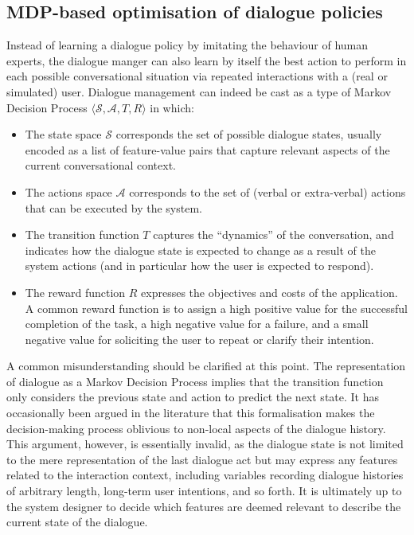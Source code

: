 
\subsection{MDP-based optimisation of dialogue policies}

Instead of learning a dialogue policy by imitating the behaviour of human experts, the dialogue manger can also learn by itself the best action to perform in each possible conversational situation via repeated interactions with a (real or simulated) user.  Dialogue management can indeed be cast as a type of Markov Decision Process $\langle \mathcal{S}, \mathcal{A}, T, R \rangle$ in which: 
\begin{itemize}
\item The state space $\mathcal{S}$ corresponds the set of possible dialogue states, usually encoded as a list of feature-value pairs that capture relevant aspects of the current conversational context.
\item The actions space $\mathcal{A}$ corresponds to the set of (verbal or extra-verbal) actions that can be executed by the system.
\item The transition function $T$ captures the ``dynamics'' of the conversation, and indicates how the dialogue state is expected to change as a result of the system actions (and in particular how the user is expected to respond). 
\item The reward function $R$ expresses the objectives and costs of the application. A common reward function is to assign a high positive value for the successful completion of the task, a high negative value for a failure, and a small negative value for soliciting the user to repeat or clarify their intention.  
\end{itemize}

A common misunderstanding should be clarified at this point. The representation of dialogue as a Markov Decision Process implies that the transition function only considers the previous state and action to predict the next state.  It has occasionally been argued in the literature that this formalisation makes the decision-making process oblivious to non-local aspects of the dialogue history. This argument, however, is essentially invalid, as the dialogue state is not limited to the mere representation of the last dialogue act but may express any features related to the interaction context, including variables recording dialogue histories of arbitrary length, long-term user intentions, and so forth.  It is ultimately up to the system designer to decide which features are deemed relevant to describe the current state of the dialogue. 

